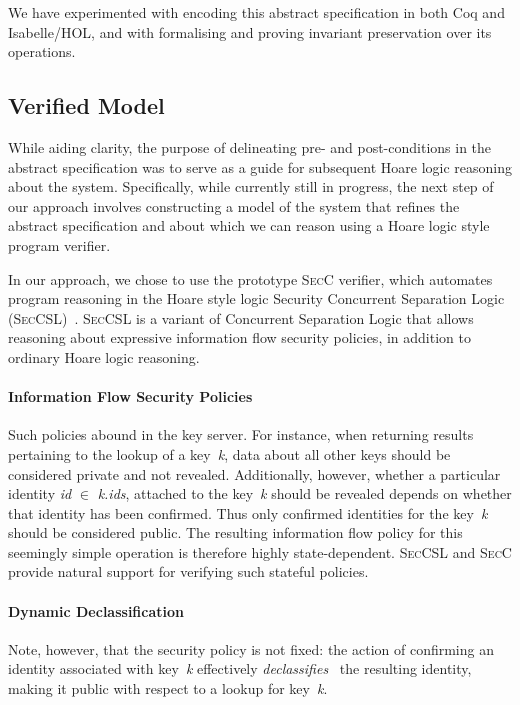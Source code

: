 \documentclass{llncs}
\newcommand{\SecCSL}{\textsc{SecCSL}\xspace}
\newcommand{\SecC}{\textsc{SecC}\xspace}
\begin{document}
We have experimented with encoding this abstract specification in both
Coq and Isabelle/HOL, and with formalising and proving invariant preservation
over its operations.

\subsection{Verified Model}

While aiding clarity, the purpose of
delineating pre- and post-conditions in the abstract specification was to
serve as a guide for subsequent Hoare logic reasoning about the system.
Specifically, while currently still in progress, the next step of our approach
involves constructing a model of the system
that refines the abstract specification and about which we can reason using
a Hoare logic style program verifier.

In our approach, we chose to use the prototype \SecC verifier, which
automates program reasoning in the Hoare style logic Security Concurrent
Separation Logic (\SecCSL)~\cite{Ernst_Murray_19}. \SecCSL is a variant of
Concurrent Separation Logic that allows reasoning about expressive
information flow security policies, in addition to ordinary Hoare logic
reasoning.

\paragraph{Information Flow Security Policies}

Such policies abound in the key server. For instance, when returning
results pertaining to the lookup of a key~\emph{k}, data about all other keys
should be considered private and not revealed. Additionally, however, whether
a particular identity \emph{id} $\in$ \emph{k.ids}, attached to the
key~\emph{k} should be revealed depends on whether that identity has been
confirmed. Thus only confirmed identities for the key~\emph{k} should be
considered public. The resulting information flow policy for this seemingly
simple operation is therefore highly state-dependent. \SecCSL and \SecC
provide natural support for verifying such stateful policies.


\paragraph{Dynamic Declassification}

Note, however, that the security policy is not fixed: the action of
confirming an identity associated with key~\emph{k} effectively
\emph{declassifies}~\cite{Sabelfeld_Sands_09} the resulting identity,
making it public with respect to a lookup for key~\emph{k}.
\end{document}
